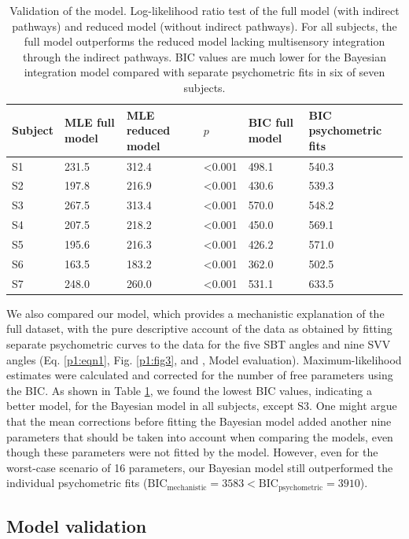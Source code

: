 \begin{table}
\begin{tabular}{llllll}
\hline
Subject & MLE full model & MLE reduced model & $p$ & BIC full model & BIC psychometric fits \\
\hline
S1 & 231.5 & 312.4 & \textless 0.001 & 498.1 & 540.3 \\
S2 & 197.8 & 216.9 & \textless 0.001 & 430.6 & 539.3 \\
S3 & 267.5 & 313.4 & \textless 0.001 & 570.0 & 548.2 \\
S4 & 207.5 & 218.2 & \textless 0.001 & 450.0 & 569.1 \\
S5 & 195.6 & 216.3 & \textless 0.001 & 426.2 & 571.0 \\
S6 & 163.5 & 183.2 & \textless 0.001 & 362.0 & 502.5 \\
S7 & 248.0 & 260.0 & \textless 0.001 & 531.1 & 633.5 \\ 
\end{tabular}
\caption{Validation of the model. Log-likelihood ratio test of the full model (with indirect pathways) and reduced model (without indirect pathways). For all subjects, the full model outperforms the reduced model lacking multisensory integration through the indirect pathways. BIC values are much lower for the Bayesian integration model compared with separate psychometric fits in six of seven subjects.}
\label{p1:tab2}
\end{table}

We also compared our model, which provides a mechanistic explanation of the full dataset, with the pure descriptive account of the data as obtained by fitting separate psychometric curves to the data for the five SBT angles and nine SVV angles (Eq. \ref{p1:eqn1}, Fig. \ref{p1:fig3}, and , Model evaluation). Maximum-likelihood estimates were calculated and corrected for the number of free parameters using the BIC. As shown in Table \ref{p1:tab2}, we found the lowest BIC values, indicating a better model, for the Bayesian model in all subjects, except S3. One might argue that the mean corrections before fitting the Bayesian model added another nine parameters that should be taken into account when comparing the models, even though these parameters were not fitted by the model. However, even for the worst-case scenario of 16 parameters, our Bayesian model still outperformed the individual psychometric fits ($\text{BIC}_\text{mechanistic} = 3583 < \text{BIC}_\text{psychometric} = \text{3910}$). 

\subsection{Model validation}
 
